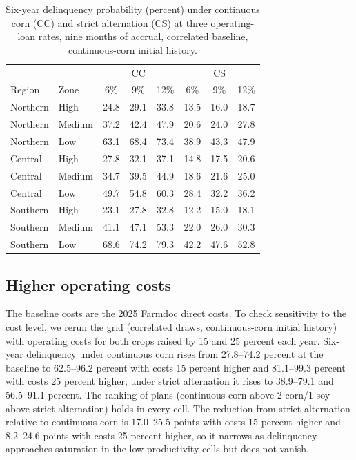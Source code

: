 \documentclass[11pt,letterpaper]{article}
\theoremstyle{remark}
\begin{document}
\begin{table}[htbp]
\centering
\caption{Six-year delinquency probability (percent) under continuous corn (CC) and strict alternation (CS) at three operating-loan rates, nine months of accrual, correlated baseline, continuous-corn initial history.}
\label{tab:rate_sens}
\small
\begin{tabular}{llcccccc}
\hline
 & & \multicolumn{3}{c}{CC} & \multicolumn{3}{c}{CS} \\
Region & Zone & 6\% & 9\% & 12\% & 6\% & 9\% & 12\% \\
\hline
Northern & High   & 24.8 & 29.1 & 33.8 & 13.5 & 16.0 & 18.7 \\
Northern & Medium & 37.2 & 42.4 & 47.9 & 20.6 & 24.0 & 27.8 \\
Northern & Low    & 63.1 & 68.4 & 73.4 & 38.9 & 43.3 & 47.9 \\
Central  & High   & 27.8 & 32.1 & 37.1 & 14.8 & 17.5 & 20.6 \\
Central  & Medium & 34.7 & 39.5 & 44.9 & 18.6 & 21.6 & 25.0 \\
Central  & Low    & 49.7 & 54.8 & 60.3 & 28.4 & 32.2 & 36.2 \\
Southern & High   & 23.1 & 27.8 & 32.8 & 12.2 & 15.0 & 18.1 \\
Southern & Medium & 41.1 & 47.1 & 53.3 & 22.0 & 26.0 & 30.3 \\
Southern & Low    & 68.6 & 74.2 & 79.3 & 42.2 & 47.6 & 52.8 \\
\hline
\end{tabular}
\end{table}

\subsection{\label{subsec:cost_sens}Higher operating costs}
The baseline costs are the 2025 Farmdoc direct costs. To check sensitivity to the cost level, we rerun the grid (correlated draws, continuous-corn initial history) with operating costs for both crops raised by 15 and 25 percent each year. Six-year delinquency under continuous corn rises from 27.8--74.2 percent at the baseline to 62.5--96.2 percent with costs 15 percent higher and 81.1--99.3 percent with costs 25 percent higher; under strict alternation it rises to 38.9--79.1 and 56.5--91.1 percent. The ranking of plans (continuous corn above 2-corn/1-soy above strict alternation) holds in every cell. The reduction from strict alternation relative to continuous corn is 17.0--25.5 points with costs 15 percent higher and 8.2--24.6 points with costs 25 percent higher, so it narrows as delinquency approaches saturation in the low-productivity cells but does not vanish.

\newpage

 
\end{document}
